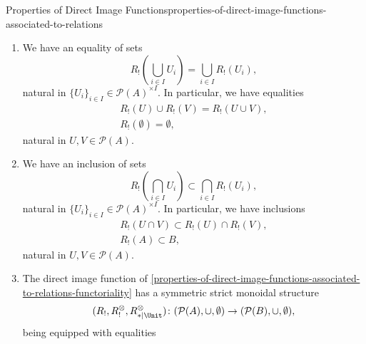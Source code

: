 \begin{proposition}{Properties of Direct Image Functions}{properties-of-direct-image-functions-associated-to-relations}
\begin{enumerate}
\begin{itemize}
\begin{itemize}
                    \end{itemize}
            \end{itemize}
        \item\label{properties-of-direct-image-functions-associated-to-relations-preservation-of-colimits}We have an equality of sets
            \[
                R_{!}(\bigcup_{i\in I}U_{i})%
                =%
                \bigcup_{i\in I}R_{!}(U_{i}),%
            \]%
            natural in $\{U_{i}\}_{i\in I}\in\mathcal{P}(A)^{\times I}$. In particular, we have equalities%
            \[
                \begin{gathered}
                    R_{!}(U)\cup R_{!}(V)                  = R_{!}(U\cup V),\\
                    R_{!}(\emptyset)                       = \emptyset,
                \end{gathered}
            \]%
            natural in $U,V\in\mathcal{P}(A)$.
        \item\label{properties-of-direct-image-functions-associated-to-relations-oplax-preservation-of-limits}We have an inclusion of sets
            \[
                R_{!}(\bigcap_{i\in I}U_{i})%
                \subset%
                \bigcap_{i\in I}R_{!}(U_{i}),%
            \]%
            natural in $\{U_{i}\}_{i\in I}\in\mathcal{P}(A)^{\times I}$. In particular, we have inclusions%
            \[
                \begin{gathered}
                    R_{!}(U\cap V) \subset R_{!}(U)\cap R_{!}(V),\\
                    R_{!}(A)       \subset B,
                \end{gathered}
            \]%
            natural in $U,V\in\mathcal{P}(A)$.
        \item\label{properties-of-direct-image-functions-associated-to-relations-symmetric-strict-monoidality-with-respect-to-unions}The direct image function of \cref{properties-of-direct-image-functions-associated-to-relations-functoriality} has a symmetric strict monoidal structure
            \[
                (R_{!},R^{\otimes}_{!},R^{\otimes}_{*|\Unit})
                \colon
                (\mathcal{P}(A),\cup,\emptyset)
                \to
                (\mathcal{P}(B),\cup,\emptyset),
            \]%
            being equipped with equalities%
            \[
                \begin{gathered}

\end{gathered}\]
\end{enumerate}
\end{proposition}
